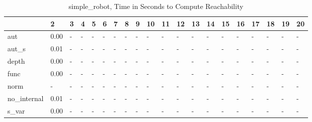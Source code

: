 \begin{table}
\caption{simple_robot, Time in Seconds to Compute Reachability}
\label{simple_robot_states_time}
\begin{tabular}{llllllllllllllllllll}
\toprule
 & 2 & 3 & 4 & 5 & 6 & 7 & 8 & 9 & 10 & 11 & 12 & 13 & 14 & 15 & 16 & 17 & 18 & 19 & 20 \\
\midrule
aut & 0.00 & - & - & - & - & - & - & - & - & - & - & - & - & - & - & - & - & - & - \\
aut_s & 0.01 & - & - & - & - & - & - & - & - & - & - & - & - & - & - & - & - & - & - \\
depth & 0.00 & - & - & - & - & - & - & - & - & - & - & - & - & - & - & - & - & - & - \\
func & 0.00 & - & - & - & - & - & - & - & - & - & - & - & - & - & - & - & - & - & - \\
norm & - & - & - & - & - & - & - & - & - & - & - & - & - & - & - & - & - & - & - \\
no_internal & 0.01 & - & - & - & - & - & - & - & - & - & - & - & - & - & - & - & - & - & - \\
s_var & 0.00 & - & - & - & - & - & - & - & - & - & - & - & - & - & - & - & - & - & - \\
\bottomrule
\end{tabular}
\end{table}
